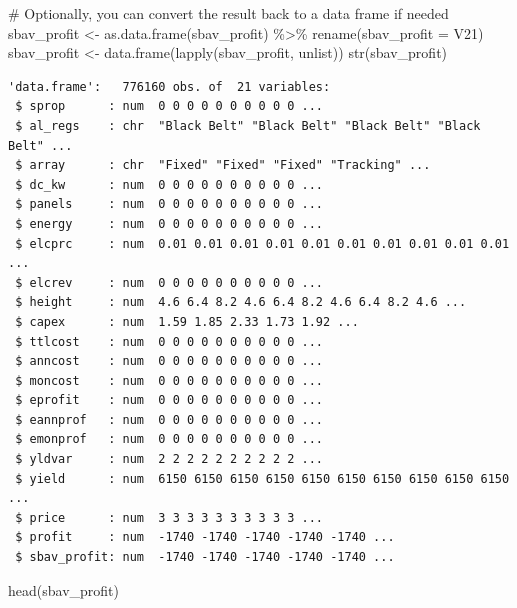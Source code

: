 \documentclass[
  letterpaper,
  DIV=11,
  numbers=noendperiod]{scrartcl}
\newenvironment{Shaded}{\begin{snugshade}}{\end{snugshade}}
\newcommand{\AttributeTok}[1]{\textcolor[rgb]{0.40,0.45,0.13}{#1}}
\newcommand{\CommentTok}[1]{\textcolor[rgb]{0.37,0.37,0.37}{#1}}
\newcommand{\FunctionTok}[1]{\textcolor[rgb]{0.28,0.35,0.67}{#1}}
\newcommand{\NormalTok}[1]{\textcolor[rgb]{0.00,0.23,0.31}{#1}}
\newcommand{\OtherTok}[1]{\textcolor[rgb]{0.00,0.23,0.31}{#1}}
\newcommand{\SpecialCharTok}[1]{\textcolor[rgb]{0.37,0.37,0.37}{#1}}
\begin{document}
\begin{Shaded}
\begin{Highlighting}[]
\CommentTok{\# Optionally, you can convert the result back to a data frame if needed}
\NormalTok{sbav\_profit }\OtherTok{\textless{}{-}} \FunctionTok{as.data.frame}\NormalTok{(sbav\_profit) }\SpecialCharTok{\%\textgreater{}\%}
  \FunctionTok{rename}\NormalTok{(}\AttributeTok{sbav\_profit =}\NormalTok{ V21)}
\NormalTok{sbav\_profit }\OtherTok{\textless{}{-}} \FunctionTok{data.frame}\NormalTok{(}\FunctionTok{lapply}\NormalTok{(sbav\_profit, unlist))}
\FunctionTok{str}\NormalTok{(sbav\_profit)}
\end{Highlighting}
\end{Shaded}

\begin{verbatim}
'data.frame':   776160 obs. of  21 variables:
 $ sprop      : num  0 0 0 0 0 0 0 0 0 0 ...
 $ al_regs    : chr  "Black Belt" "Black Belt" "Black Belt" "Black Belt" ...
 $ array      : chr  "Fixed" "Fixed" "Fixed" "Tracking" ...
 $ dc_kw      : num  0 0 0 0 0 0 0 0 0 0 ...
 $ panels     : num  0 0 0 0 0 0 0 0 0 0 ...
 $ energy     : num  0 0 0 0 0 0 0 0 0 0 ...
 $ elcprc     : num  0.01 0.01 0.01 0.01 0.01 0.01 0.01 0.01 0.01 0.01 ...
 $ elcrev     : num  0 0 0 0 0 0 0 0 0 0 ...
 $ height     : num  4.6 6.4 8.2 4.6 6.4 8.2 4.6 6.4 8.2 4.6 ...
 $ capex      : num  1.59 1.85 2.33 1.73 1.92 ...
 $ ttlcost    : num  0 0 0 0 0 0 0 0 0 0 ...
 $ anncost    : num  0 0 0 0 0 0 0 0 0 0 ...
 $ moncost    : num  0 0 0 0 0 0 0 0 0 0 ...
 $ eprofit    : num  0 0 0 0 0 0 0 0 0 0 ...
 $ eannprof   : num  0 0 0 0 0 0 0 0 0 0 ...
 $ emonprof   : num  0 0 0 0 0 0 0 0 0 0 ...
 $ yldvar     : num  2 2 2 2 2 2 2 2 2 2 ...
 $ yield      : num  6150 6150 6150 6150 6150 6150 6150 6150 6150 6150 ...
 $ price      : num  3 3 3 3 3 3 3 3 3 3 ...
 $ profit     : num  -1740 -1740 -1740 -1740 -1740 ...
 $ sbav_profit: num  -1740 -1740 -1740 -1740 -1740 ...
\end{verbatim}

\begin{Shaded}
\begin{Highlighting}[]
\FunctionTok{head}\NormalTok{(sbav\_profit)}
\end{Highlighting}
\end{Shaded}
\end{document}
